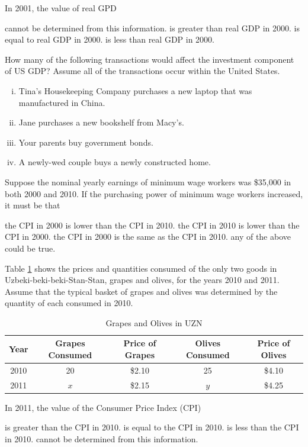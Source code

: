 \documentclass[addpoints,11pt]{exam}
\theoremstyle{definition}
\begin{document}
\begin{questions}
In 2001, the value of real GPD 

\begin{choices}
	\choice cannot be determined from this information.
	\choice is greater than real GDP in 2000.
	\choice is equal to real GDP in 2000.
	\CorrectChoice is less than real GDP in 2000.
\end{choices}


\newpage


\question How many of the following transactions would affect the investment component of US GDP? Assume all of the transactions occur within the United States.

\begin{enumerate}[(i)]
	\item Tina's Housekeeping Company purchases a new laptop that was manufactured in China.
	\item Jane purchases a new bookshelf from Macy's.
	\item Your parents buy government bonds.
	\item A newly-wed couple buys a newly constructed home.
\end{enumerate}

\begin{choices}
\end{choices}	

\question Suppose the nominal yearly earnings of minimum wage workers was \$35,000 in both 2000 and 2010. If the purchasing power of minimum wage workers increased, it must be that

\begin{choices}
	\choice the CPI in 2000 is lower than the CPI in 2010.
	\CorrectChoice the CPI in 2010 is lower than the CPI in 2000.
	\choice the CPI in 2000 is the same as the CPI in 2010.
	\choice any of the above could be true.
\end{choices}



\question Table \ref{blahan} shows the prices and quantities consumed of the only two goods in Uzbeki-beki-beki-Stan-Stan, grapes and olives, for the years 2010 and 2011. Assume that the typical basket of grapes and olives was determined by the quantity of each consumed in 2010.

\begin{table}[H]
	\caption{Grapes and Olives in UZN}
	\centering
	\begin{tabular}{c|c|c|c|c}
		Year & Grapes Consumed & Price of Grapes & Olives Consumed & Price of Olives \\
		\hline
		2010 & 20 & \$2.10 & 25 & \$4.10\\
		2011 & $x$ & \$2.15 & $y$ & \$4.25 \\
	\end{tabular} 
	\label{blahan}
\end{table}

In 2011, the value of the Consumer Price Index (CPI) 

\begin{choices}
	\CorrectChoice is greater than the CPI in 2010.
	\choice is equal to the CPI in 2010.
	\choice is less than the CPI in 2010.
	\choice cannot be determined from this information.
\end{choices}


\end{questions}	
\end{document}
